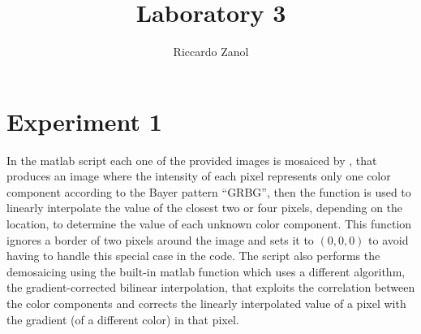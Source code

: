 \documentclass[a4paper,oneside]{article}
\author{Riccardo Zanol}
\title{Laboratory 3}
\begin{document}
\matlabcodeconfig
\maketitle
\section*{Experiment 1}
In the matlab script  each one of the provided
 images is mosaiced by
, that produces an image where the intensity
of each pixel represents only one color component according to the
Bayer pattern ``GRBG'', then the function 
is used to linearly interpolate the value of the closest two or four
pixels, depending on the location, to determine the value of each
unknown color component. This function ignores a border of two pixels
around the image and sets it to $(0,0,0)$ to avoid having to handle
this special case in the code.  The script also performs the
demosaicing using the built-in matlab function 
which uses a different algorithm, the gradient-corrected bilinear
interpolation, that exploits the correlation between the color
components and corrects the linearly interpolated value of a pixel
with the gradient (of a different color) in that pixel.
\end{document}

